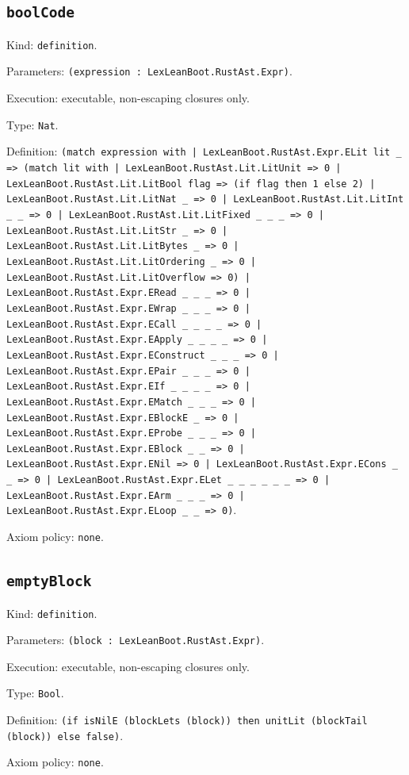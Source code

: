 \documentclass[11pt]{article}
\begin{document}
\subsection*{\texttt{boolCode}}
\noindent Kind: \texttt{definition}.\par
\noindent Parameters: \texttt{(expression : LexLeanBoot.RustAst.Expr)}.\par
\noindent Execution: executable, non-escaping closures only.\par
\noindent Type: \texttt{Nat}.\par
\noindent Definition: \texttt{(match expression with | LexLeanBoot.RustAst.Expr.ELit lit \_ => (match lit with | LexLeanBoot.RustAst.Lit.LitUnit => 0 | LexLeanBoot.RustAst.Lit.LitBool flag => (if flag then 1 else 2) | LexLeanBoot.RustAst.Lit.LitNat \_ => 0 | LexLeanBoot.RustAst.Lit.LitInt \_ \_ => 0 | LexLeanBoot.RustAst.Lit.LitFixed \_ \_ \_ => 0 | LexLeanBoot.RustAst.Lit.LitStr \_ => 0 | LexLeanBoot.RustAst.Lit.LitBytes \_ => 0 | LexLeanBoot.RustAst.Lit.LitOrdering \_ => 0 | LexLeanBoot.RustAst.Lit.LitOverflow => 0) | LexLeanBoot.RustAst.Expr.ERead \_ \_ \_ => 0 | LexLeanBoot.RustAst.Expr.EWrap \_ \_ \_ => 0 | LexLeanBoot.RustAst.Expr.ECall \_ \_ \_ \_ => 0 | LexLeanBoot.RustAst.Expr.EApply \_ \_ \_ \_ => 0 | LexLeanBoot.RustAst.Expr.EConstruct \_ \_ \_ => 0 | LexLeanBoot.RustAst.Expr.EPair \_ \_ \_ => 0 | LexLeanBoot.RustAst.Expr.EIf \_ \_ \_ \_ => 0 | LexLeanBoot.RustAst.Expr.EMatch \_ \_ \_ => 0 | LexLeanBoot.RustAst.Expr.EBlockE \_ => 0 | LexLeanBoot.RustAst.Expr.EProbe \_ \_ \_ => 0 | LexLeanBoot.RustAst.Expr.EBlock \_ \_ => 0 | LexLeanBoot.RustAst.Expr.ENil => 0 | LexLeanBoot.RustAst.Expr.ECons \_ \_ => 0 | LexLeanBoot.RustAst.Expr.ELet \_ \_ \_ \_ \_ \_ => 0 | LexLeanBoot.RustAst.Expr.EArm \_ \_ \_ => 0 | LexLeanBoot.RustAst.Expr.ELoop \_ \_ => 0)}.\par
\noindent Axiom policy: \texttt{none}.\par
\subsection*{\texttt{emptyBlock}}
\noindent Kind: \texttt{definition}.\par
\noindent Parameters: \texttt{(block : LexLeanBoot.RustAst.Expr)}.\par
\noindent Execution: executable, non-escaping closures only.\par
\noindent Type: \texttt{Bool}.\par
\noindent Definition: \texttt{(if isNilE (blockLets (block)) then unitLit (blockTail (block)) else false)}.\par
\noindent Axiom policy: \texttt{none}.\par
\end{document}

